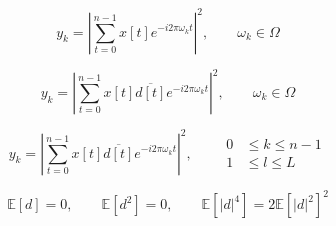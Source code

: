 





























			




\begin{equation*}
	y_k = \left| \sum_{t=0}^{n-1} x[t] e^{-i2\pi\omega_kt} \right|^2 , \qquad \omega_k \in \Omega
  \end{equation*}
  
  \begin{equation*}
	y_k = \left| \sum_{t=0}^{n-1} x[t]\overline{d[t]} e^{-i2\pi\omega_kt} \right|^2 , \qquad \omega_k \in \Omega
  \end{equation*}
  
  \begin{equation*}
	y_k = \left| \sum_{t=0}^{n-1} x[t]\overline{d[t]} e^{-i2\pi\omega_kt} \right|^2 , \qquad \begin{split}
	0 &\leq k \leq n-1\\
	1 &\leq l \leq L
	\end{split}
  \end{equation*}
  
  \begin{equation*}
	\mathbb{E}\left[d\right] = 0, \qquad \mathbb{E}\left[d^2\right] = 0, \qquad\mathbb{E}\left[\left|d\right|^4\right] = 2\mathbb{E}\left[\left|d\right|^2\right]^2
  \end{equation*}
  
